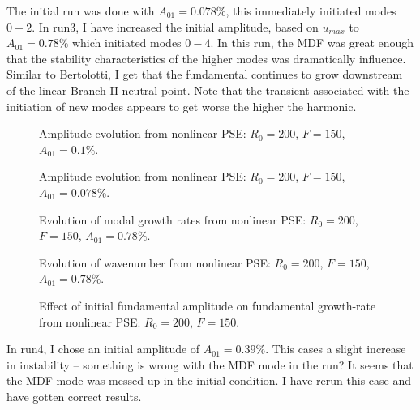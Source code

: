 \documentclass[12pt]{article}
\begin{document}
The initial run was done with $A_{01} = 0.078\%$, this immediately initiated
modes $0-2$.  In run3, I have increased the initial amplitude, based on
$u_{max}$ to $A_{01} = 0.78\%$ which initiated modes $0-4$.  In this run, the
MDF was great enough that the stability characteristics of the higher modes
was dramatically influence.  Similar to Bertolotti, I get that the fundamental
continues to grow downstream of the linear Branch II neutral point.  Note that
the transient associated with the initiation of new modes appears to get worse
the higher the harmonic.

\begin{figure}
\centering \epsfxsize=4.5in 
\caption {Amplitude evolution from nonlinear PSE: $R_0=200$, $F=150$,
$A_{01}=0.1\%$. \label{f:amp.r2}}
\end{figure}

\begin{figure}
\centering \epsfxsize=4.5in 
\caption {Amplitude evolution from nonlinear PSE: $R_0=200$, $F=150$,
$A_{01}=0.078\%$. \label{f:amp.r3}}
\end{figure}

\begin{figure}
\centering \epsfxsize=4.5in 
\setvlabel{$-\gamma$}
\caption {Evolution of modal growth rates from nonlinear PSE: $R_0=200$,
$F=150$, $A_{01}=0.78\%$. \label{f:gr.r3}}
\end{figure}

\begin{figure}
\centering \epsfxsize=4.5in 
\setvlabel{$\alpha$}
\caption {Evolution of wavenumber from nonlinear PSE: $R_0=200$,
$F=150$, $A_{01}=0.78\%$. \label{f:alp.r3}}
\end{figure}

\begin{figure}
\centering \epsfxsize=4.5in 
\setvlabel{$-\gamma$}
\caption {Effect of initial fundamental amplitude on fundamental growth-rate
from nonlinear PSE: $R_0=200$, $F=150$. \label{f:gr.amp.r3}}
\end{figure}

In run4, I chose an initial amplitude of $A_{01}=0.39\%$.  This cases a slight
increase in instability -- something is wrong with the MDF mode in the run?
It seems that the MDF mode was messed up in the initial condition.  I have
rerun this case and have gotten correct results.
\end{document}
